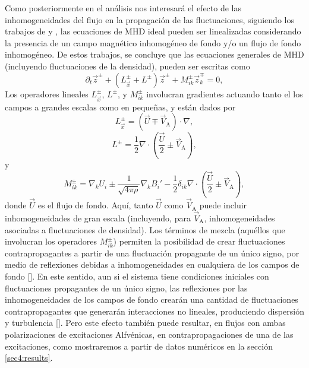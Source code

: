 Como posteriormente en el análisis nos interesará el efecto de las
inhomogeneidades del flujo en la propagación de las fluctuaciones,
siguiendo los trabajos de \cite{matthaeus_transport_1994}
y \cite{zhou_transport_1990}, las ecuaciones de MHD ideal pueden ser
linealizadas considerando la presencia de un campo magnético
inhomogéneo de fondo y/o un flujo de fondo inhomogéneo. De estos
trabajos, se concluye que las ecuaciones generales de MHD (incluyendo
fluctuaciones de la densidad), pueden ser escritas como
\begin{equation}\label{eq4:MHD_zpzm}
  \partial_t \vec{z}^\pm
  + \left( L^\pm_\vec{x} + L^\pm \right) \vec{z}^\pm
  + M^\pm_{ik} \vec{z}^\mp_k
  = 0,
\end{equation}
Los operadores lineales $L^\pm_\vec{x}$, $L^\pm$, y $M^\pm_{ik}$
involucran gradientes actuando tanto el los campos a grandes escalas
como en pequeñas, y están dados por
\begin{equation}\label{eq4:MHD_Lx}
  L^\pm_\vec{x} = \left( \vec{U} \mp \vec{V}_\textrm{A} \right) \cdot \nabla ,
\end{equation}
\begin{equation}\label{eq4:MHD_L}
  L^\pm = \frac{1}{2} \nabla \cdot \left( \frac{\vec{U}}{2} \pm \vec{V}_\textrm{A} 
  \right) ,
\end{equation}
y
\begin{equation}\label{eq4:MHD_Mik}
  M^\pm_{ik} = \nabla_k U_i \pm \frac{1}{\sqrt{4\pi\rho}} \nabla_k B_i'
  - \frac{1}{2} \delta_{ik} \nabla\cdot \left( \frac{\vec{U}}{2} \pm
  \vec{V}_\textrm{A} \right) ,
\end{equation}
donde $\vec{U}$ es el flujo de fondo. Aquí, tanto $\vec{U}$ como
$\vec{V}_\textrm{A}$ puede incluir inhomogeneidades de gran escala
(incluyendo, para $\vec{V}_\textrm{A}$, inhomogeneidades asociadas a
fluctuaciones de densidad).  Los términos de mezcla (aquéllos que
involucran los operadores $M_{ik}^\pm$) permiten la posibilidad de
crear fluctuaciones contrapropagantes a partir de una fluctuación
propagante de un único signo, por medio de reflexiones debidas a
inhomogeneidades en cualquiera de los campos de fondo
[\cite{velli_1993_propagation}]. En este sentido, aun si el sistema
tiene condiciones iniciales con fluctuaciones propagantes de un único
signo, las reflexiones por las inhomogeneidades de los campos de fondo
crearán una cantidad de fluctuaciones contrapropagantes que generarán
interacciones no lineales, produciendo dispersión y turbulencia
[\cite{matthaeus_1999_coronal, dmitruk_2001_coronal}]. Pero este efecto
también puede resultar, en flujos con ambas polarizaciones de
excitaciones Alfvénicas, en contrapropagaciones de una de las
excitaciones, como mostraremos a partir de datos numéricos en la
sección \ref{sec4:results}.


